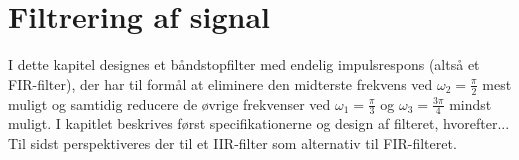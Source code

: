 \chapter{Filtrering af signal}
I dette kapitel designes et båndstopfilter med endelig impulsrespons (altså et FIR-filter), der har til formål at eliminere den midterste frekvens ved $\omega_2 = \frac{\pi}{2}$ mest muligt og samtidig reducere de øvrige frekvenser ved $\omega_1 = \frac{\pi}{3}$ og $\omega_3 = \frac{3\pi}{4}$ mindst muligt. I kapitlet beskrives først specifikationerne og design af filteret, hvorefter... Til sidst perspektiveres der til et IIR-filter som alternativ til FIR-filteret.
